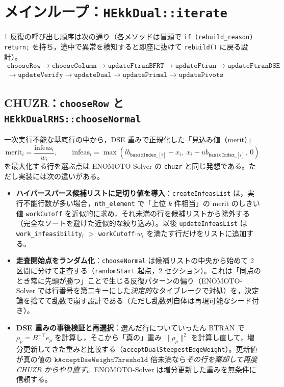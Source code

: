 \documentclass[11pt,a4paper]{ltjsarticle}
\newcommand{\code}[1]{\texttt{#1}}
\begin{document}
\section{メインループ：\code{HEkkDual::iterate}}

1 反復の呼び出し順序は次の通り（各メソッドは冒頭で \code{if (rebuild\_reason) return;} を持ち，途中で異常を検知すると即座に抜けて \code{rebuild()} に戻る設計）。
\begin{align*}
\code{chooseRow} \to \code{chooseColumn} \to \code{updateFtranBFRT} \to \code{updateFtran} \to \code{updateFtranDSE} \\
{}\to \code{updateVerify} \to \code{updateDual} \to \code{updatePrimal} \to \code{updatePivots}
\end{align*}

\subsection{CHUZR：\code{chooseRow} と \code{HEkkDualRHS::chooseNormal}}

一次実行不能な基底行の中から，DSE 重みで正規化した「見込み値（merit）」
\[
  \mathrm{merit}_i = \frac{\text{infeas}_i}{w_i}, \qquad \text{infeas}_i = \max(lb_{\code{basicIndex\_}[i]}-x_i,\ x_i-ub_{\code{basicIndex\_}[i]},\ 0)
\]
を最大化する行を選ぶ点は ENOMOTO-Solver の \code{chuzr} と同じ発想である。ただし実装には次の違いがある。

\begin{itemize}
  \item \textbf{ハイパースパース候補リストに足切り値を導入}：\code{createInfeasList} は，実行不能行数が多い場合，\code{nth\_element} で「上位 $k$ 件相当」の merit のしきい値 \code{workCutoff} を近似的に求め，それ未満の行を候補リストから除外する（完全なソートを避けた近似的な絞り込み）。以後 \code{updateInfeasList} は \code{work\_infeasibility}$_i$ $>$ \code{workCutoff}$\cdot w_i$ を満たす行だけをリストに追加する。
  \item \textbf{走査開始点をランダム化}：\code{chooseNormal} は候補リストの中央から始めて 2 区間に分けて走査する（\code{randomStart} 起点，2 セクション）。これは「同点のとき常に先頭が勝つ」ことで生じる反復パターンの偏り（ENOMOTO-Solver では行番号を第二キーにした\emph{決定的}なタイブレークで対処）を，決定論を捨てて乱数で崩す設計である（ただし乱数列自体は再現可能なシード付き）。
  \item \textbf{DSE 重みの事後検証と再選択}：選んだ行についていったん BTRAN で $\rho_p=B^{-\top}e_p$ を計算し，そこから「真の」重み $\lVert\rho_p\rVert^2$ を計算し直して，増分更新してきた重みと比較する（\code{acceptDualSteepestEdgeWeight}）。更新値が真の値の $\code{kAcceptDseWeightThreshold}$ 倍未満なら\emph{その行を棄却して再度 CHUZR からやり直す}。ENOMOTO-Solver は増分更新した重みを無条件に信頼する。
\end{itemize}
\end{document}

